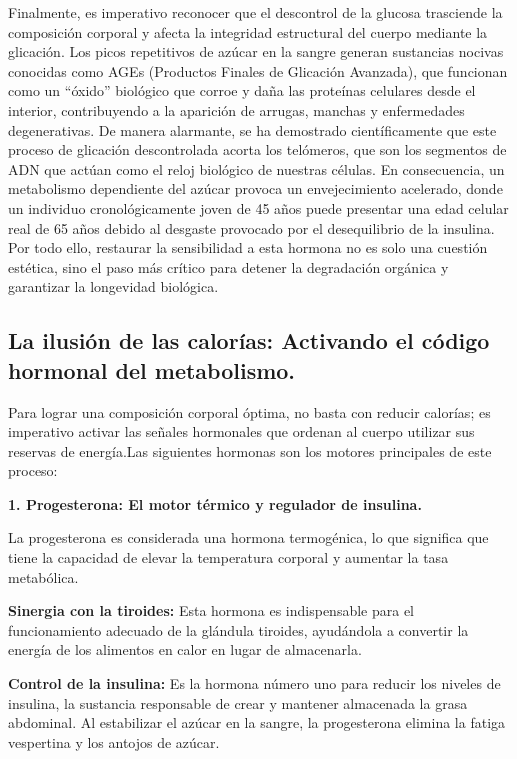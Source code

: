 \documentclass[
  spanish,
]{article}
\begin{document}
Finalmente, es imperativo reconocer que el descontrol de la glucosa trasciende la composición corporal y afecta la integridad estructural del cuerpo mediante la glicación. Los picos repetitivos de azúcar en la sangre generan sustancias nocivas conocidas como AGEs (Productos Finales de Glicación Avanzada), que funcionan como un ``óxido'' biológico que corroe y daña las proteínas celulares desde el interior, contribuyendo a la aparición de arrugas, manchas y enfermedades degenerativas. De manera alarmante, se ha demostrado científicamente que este proceso de glicación descontrolada acorta los telómeros, que son los segmentos de ADN que actúan como el reloj biológico de nuestras células.
En consecuencia, un metabolismo dependiente del azúcar provoca un envejecimiento acelerado, donde un individuo cronológicamente joven de 45 años puede presentar una edad celular real de 65 años debido al desgaste provocado por el desequilibrio de la insulina. Por todo ello, restaurar la sensibilidad a esta hormona no es solo una cuestión estética, sino el paso más crítico para detener la degradación orgánica y garantizar la longevidad biológica.

\subsection{La ilusión de las calorías: Activando el código hormonal del metabolismo.}\label{la-ilusiuxf3n-de-las-caloruxedas-activando-el-cuxf3digo-hormonal-del-metabolismo.}

Para lograr una composición corporal óptima, no basta con reducir calorías; es imperativo activar las señales hormonales que ordenan al cuerpo utilizar sus reservas de energía.Las siguientes hormonas son los motores principales de este proceso:

\textbf{1. Progesterona: El motor térmico y regulador de insulina.}

La progesterona es considerada una hormona termogénica, lo que significa que tiene la capacidad de elevar la temperatura corporal y aumentar la tasa metabólica.

\textbf{Sinergia con la tiroides:} Esta hormona es indispensable para el funcionamiento adecuado de la glándula tiroides, ayudándola a convertir la energía de los alimentos en calor en lugar de almacenarla.

\textbf{Control de la insulina:} Es la hormona número uno para reducir los niveles de insulina, la sustancia responsable de crear y mantener almacenada la grasa abdominal. Al estabilizar el azúcar en la sangre, la progesterona elimina la fatiga vespertina y los antojos de azúcar.
\end{document}
